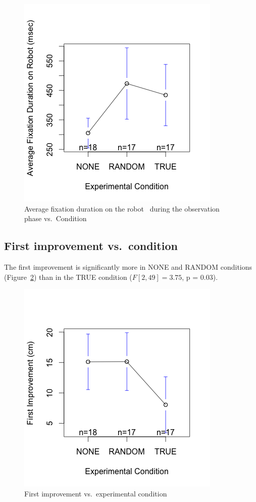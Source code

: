 \documentclass{sig-alternate}
\begin{document}
\begin{figure}[h!]
    \centering
    \includegraphics[width=0.8\linewidth]{res1}
    \caption{Average fixation duration on the robot ~during the observation phase
    vs.~Condition}
    \label{res1}
\end{figure}

\subsection{First improvement vs.~condition}

The first improvement is significantly more in NONE and RANDOM
conditions (Figure~\ref{res2}) than in the TRUE condition ($F[2,49]=3.75$, p =
0.03).

\begin{figure}[h!]
    \centering
    \includegraphics[width=0.8\linewidth]{res2}
    \caption{First improvement vs.~experimental condition}
    \label{res2}
\end{figure}
\end{document}
